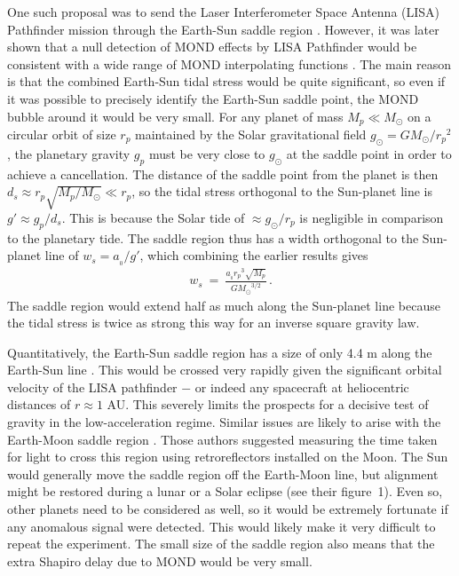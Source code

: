 \documentclass[fleqn,usenatbib,useAMS]{mnras} %
\begin{document}
One such proposal was to send the Laser Interferometer Space Antenna (LISA) Pathfinder mission \citep{Armano_2015} through the Earth-Sun saddle region \citep{Bevis_2010, Magueijo_2012}. However, it was later shown that a null detection of MOND effects by LISA Pathfinder would be consistent with a wide range of MOND interpolating functions \citep{Galianni_2012, Hees_2016}. The main reason is that the combined Earth-Sun tidal stress would be quite significant, so even if it was possible to precisely identify the Earth-Sun saddle point, the MOND bubble around it would be very small. For any planet of mass $M_p \ll M_\odot$ on a circular orbit of size $r_p$ maintained by the Solar gravitational field $g_\odot = GM_\odot/{r_p}^2$, the planetary gravity $g_p$ must be very close to $g_\odot$ at the saddle point in order to achieve a cancellation. The distance of the saddle point from the planet is then $d_s \approx r_p \sqrt{M_p/M_\odot} \ll r_p$, so the tidal stress orthogonal to the Sun-planet line is $g' \approx g_p/d_s$. This is because the Solar tide of $\approx g_\odot/r_p$ is negligible in comparison to the planetary tide. The saddle region thus has a width orthogonal to the Sun-planet line of $w_s = a_{_0}/g'$, which combining the earlier results gives
\begin{eqnarray}
    w_s ~=~ \frac{a_{_0}{r_p}^3\sqrt{M_p}}{G{M_\odot}^{3/2}} \, .
    \label{w_s}
\end{eqnarray}
The saddle region would extend half as much along the Sun-planet line because the tidal stress is twice as strong this way for an inverse square gravity law.

Quantitatively, the Earth-Sun saddle region has a size of only 4.4 m along the Earth-Sun line \citep{Penner_2020}. This would be crossed very rapidly given the significant orbital velocity of the LISA pathfinder $-$ or indeed any spacecraft at heliocentric distances of $r \approx 1$ AU. This severely limits the prospects for a decisive test of gravity in the low-acceleration regime. Similar issues are likely to arise with the Earth-Moon saddle region \citep{Magueijo_2013}. Those authors suggested measuring the time taken for light to cross this region using retroreflectors installed on the Moon. The Sun would generally move the saddle region off the Earth-Moon line, but alignment might be restored during a lunar or a Solar eclipse (see their figure~1). Even so, other planets need to be considered as well, so it would be extremely fortunate if any anomalous signal were detected. This would likely make it very difficult to repeat the experiment. The small size of the saddle region also means that the extra Shapiro delay due to MOND would be very small.
\end{document}
